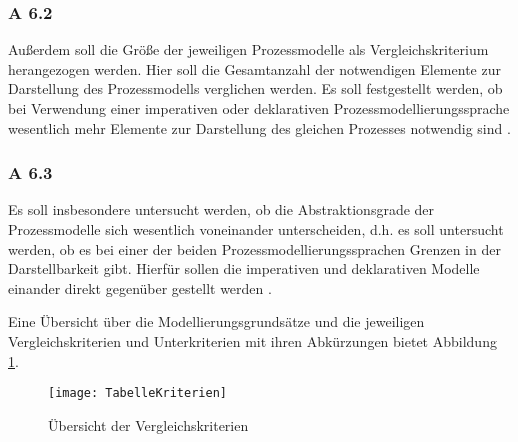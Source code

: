 \subsubsection{A 6.2}
Außerdem soll die Größe der jeweiligen Prozessmodelle als Vergleichskriterium herangezogen werden. Hier soll die Gesamtanzahl der notwendigen Elemente zur Darstellung des Prozessmodells verglichen werden. Es soll festgestellt werden, ob bei Verwendung einer imperativen oder deklarativen Prozessmodellierungssprache wesentlich mehr Elemente zur Darstellung des gleichen Prozesses notwendig sind \cite{leimeister2012, journals95, freund2007,reinshagen2009}.

 \subsubsection{A 6.3}
Es soll insbesondere untersucht werden, ob die Abstraktionsgrade der Prozessmodelle sich wesentlich voneinander unterscheiden, d.h. es soll untersucht werden, ob es bei einer der beiden Prozessmodellierungssprachen Grenzen in der Darstellbarkeit gibt. Hierfür sollen die imperativen und deklarativen Modelle einander direkt gegenüber gestellt werden \cite{leimeister2012, journals95, freund2007,reinshagen2009}.

Eine Übersicht über die Modellierungsgrundsätze und die jeweiligen Vergleichskriterien und Unterkriterien mit ihren Abkürzungen bietet Abbildung \ref{fig:TabelleKriterien}.

\begin{figure}[!htbp]
\begin{center}
  \texttt{[image: TabelleKriterien]} %
  \caption{Übersicht der Vergleichskriterien}
  \label{fig:TabelleKriterien}
\end{center}
\end{figure}









